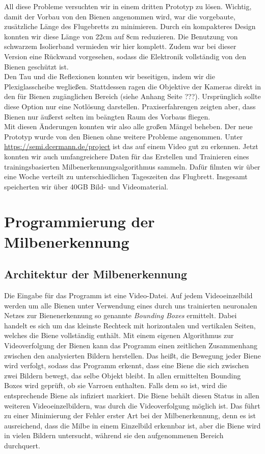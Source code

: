 \documentclass[11pt,a4paper]{article}
\begin{document}
All diese Probleme versuchten wir in einem dritten Prototyp zu lösen. Wichtig, damit der Vorbau von den Bienen angenommen wird, war die vorgebaute, zusätzliche Länge des Flugebretts zu minimieren. Durch ein kompakteres Design konnten wir diese Länge von 22cm auf 8cm reduzieren. Die Benutzung von schwarzem Isolierband vermieden wir hier komplett. Zudem war bei dieser Version eine Rückwand vorgesehen, sodass die Elektronik vollständig von den Bienen geschützt ist.\\
Den Tau und die Reflexionen konnten wir beseitigen, indem wir die Plexiglasscheibe wegließen. Stattdessen ragen die Objektive der Kameras direkt in den für Bienen zugänglichen Bereich (siehe Anhang Seite ???). Ursprünglich sollte diese Option nur eine Notlösung darstellen. Praxiserfahrengen zeigten aber, dass Bienen nur äußerst selten im beängten Raum des Vorbaus fliegen.\\
Mit diesen Änderungen konnten wir also alle großen Mängel beheben. Der neue Prototyp wurde von den Bienen ohne weitere Probleme angenommen. Unter \url{https://semi.dcermann.de/project} ist das auf einem Video gut zu erkennen. Jetzt konnten wir auch umfangreichere Daten für das Erstellen und Trainieren eines trainingsbasierten Milbenerkennungsalgorithmus sammeln. Dafür filmten wir über eine Woche verteilt zu unterschiedlichen Tageszeiten das Flugbrett. Insgesamt speicherten wir über 40GB Bild- und Videomaterial.\\


\newpage
\section{Programmierung der Milbenerkennung} \label{section:Programmierung}
\subsection{Architektur der Milbenerkennung}
Die Eingabe für das Programm ist eine Video-Datei. Auf jedem Videoeinzelbild werden um alle Bienen unter Verwendung eines durch uns trainierten neuronalen Netzes zur Bienenerkennung so genannte \textit{Bounding Boxes} ermittelt. Dabei handelt es sich um das kleinste Rechteck mit horizontalen und vertikalen Seiten, welches die Biene vollständig enthält. Mit einem eigenen Algorithmus zur Videoverfolgung der Bienen kann das Programm einen zeitlichen Zusammenhang zwischen den analysierten Bildern herstellen. Das heißt, die Bewegung jeder Biene wird verfolgt, sodass das Programm erkennt, dass eine Biene die sich zwischen zwei Bildern bewegt, das selbe Objekt bleibt. In allen ermittelten Bounding Boxes wird geprüft, ob sie Varroen enthalten. Falls dem so ist, wird die entsprechende Biene als infiziert markiert. Die Biene behält diesen Status in allen weiteren Videoeinzelbildern, was durch die Videoverfolgung möglich ist. Das führt zu einer Minimierung der Fehler erster Art bei der Milbenerkennung, denn es ist ausreichend, dass die Milbe in einem Einzelbild erkennbar ist, aber die Biene wird in vielen Bildern untersucht, während sie den aufgenommenen Bereich durchquert.
\end{document}
